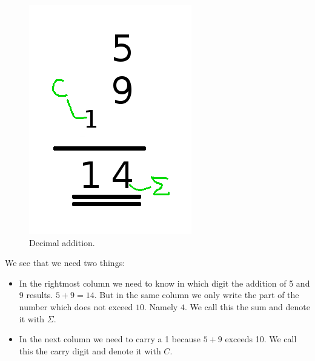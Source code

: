 \documentclass[10pt,a4paper]{article}
\begin{document}
	\begin{figure}[H]
		\centering		  
		\includegraphics[scale=0.3]{decimal_addition.png}
		\caption{Decimal addition.}
		\label{fig:decimal_addition}
	\end{figure}
	We see that we need two things:
	\begin{itemize}
		\item In the rightmost column we need to know in which digit the addition of 5 and 9 results. $5+9=14$. But in the same column we only write the part of the number which does not exceed $10$. Namely $4$. We call this the sum and denote it with $\Sigma$.
		\item In the next column we need to carry a 1 because $5+9$ exceeds 10. We call this the carry digit and denote it with $C$.
	\end{itemize}
	
\end{document}
